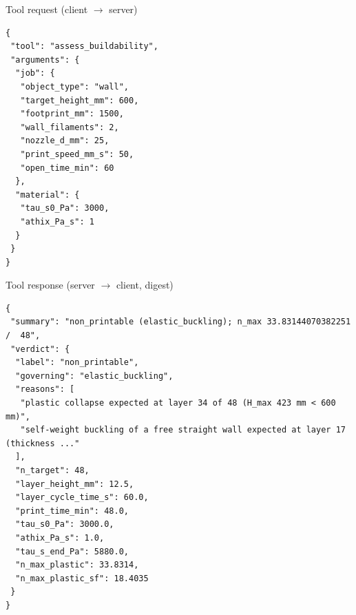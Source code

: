 \begin{mcpbox}{Tool request (client $\rightarrow$ server)}
\begin{lstlisting}[style=jsonstyle]
{
 "tool": "assess_buildability",
 "arguments": {
  "job": {
   "object_type": "wall",
   "target_height_mm": 600,
   "footprint_mm": 1500,
   "wall_filaments": 2,
   "nozzle_d_mm": 25,
   "print_speed_mm_s": 50,
   "open_time_min": 60
  },
  "material": {
   "tau_s0_Pa": 3000,
   "athix_Pa_s": 1
  }
 }
}
\end{lstlisting}
\end{mcpbox}
\begin{mcpbox}{Tool response (server $\rightarrow$ client, digest)}
\begin{lstlisting}[style=jsonstyle]
{
 "summary": "non_printable (elastic_buckling); n_max 33.83144070382251 /  48",
 "verdict": {
  "label": "non_printable",
  "governing": "elastic_buckling",
  "reasons": [
   "plastic collapse expected at layer 34 of 48 (H_max 423 mm < 600 mm)",
   "self-weight buckling of a free straight wall expected at layer 17 (thickness ..."
  ],
  "n_target": 48,
  "layer_height_mm": 12.5,
  "layer_cycle_time_s": 60.0,
  "print_time_min": 48.0,
  "tau_s0_Pa": 3000.0,
  "athix_Pa_s": 1.0,
  "tau_s_end_Pa": 5880.0,
  "n_max_plastic": 33.8314,
  "n_max_plastic_sf": 18.4035
 }
}
\end{lstlisting}
\end{mcpbox}